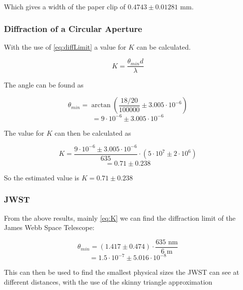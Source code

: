 \documentclass{emulateapj}
\begin{document}
Which gives a width of the paper clip of $0.4743 \pm 0.01281 \text{ mm}$.

\subsubsection{Diffraction of a Circular Aperture}

With the use of \eqref{eq:diffLimit} a value for $K$ can be calculated.

\begin{equation}
K = \frac{\theta_{min} d}{\lambda}
\end{equation}

The angle can be found as

\begin{equation}
\theta_{min} = \arctan\left(\frac{18/20}{100000} \pm 3.005\cdot 10^{-6} \right)
\end{equation}
\begin{equation}
= 9\cdot 10^{-6} \pm 3.005\cdot 10^{-6}
\end{equation}

The value for $K$ can then be calculated as 

\begin{equation}
K = \frac{9\cdot 10^{-6} \pm 3.005\cdot 10^{-6}}{635}\cdot(5\cdot10^7 \pm 2\cdot10^6)
\end{equation}
\begin{equation}
= 0.71 \pm 0.238
\end{equation}\label{eq:K}

So the estimated value is $K = 0.71 \pm 0.238$

\subsubsection{JWST}
From the above results, mainly \eqref{eq:K} we can find the diffraction limit of the James Webb Space Telescope:

\begin{equation}
\theta_{min} = (1.417 \pm 0.474) \cdot \frac{635 \text{ nm}}{6 \text{ m}}
\end{equation}
\begin{equation}
= 1.5\cdot 10^{-7} \pm 5.016\cdot 10^{-8}
\end{equation}\label{JWSTDiffLimit}

This can then be used to find the smallest physical sizes the JWST can see at different distances, with the use of the skinny triangle approximation
\end{document}
